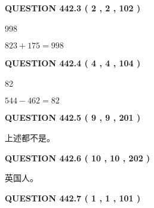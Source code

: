 \documentclass{ctexart}
\begin{document}
{\textbf{\Large{QUESTION
442.3 
 ( 2 , 2 , 102 )
}}}
  
  
 
 
\noindent{}

998
 
 
 
 
\noindent{}

$ %
823 +  %
175=   %
998$
 
 
  
\vspace{0.2in}
  
{\textbf{\Large{QUESTION
442.4 
 ( 4 , 4 , 104 )
}}}
  
  
 
 
\noindent{}

82
 
 
 
 
\noindent{}

$ %
544 -  %
462=   %
82$
 
 
  
\vspace{0.2in}
  
{\textbf{\Large{QUESTION
442.5 
 ( 9 , 9 , 201 )
}}}
  
  
 
 
\noindent{}
 
 
 上述都不是。
 
 
 
 
  
\vspace{0.2in}
  
{\textbf{\Large{QUESTION
442.6 
 ( 10 , 10 , 202 )
}}}
  
  
 
 
\noindent{}
 
 
英国人。
 
 
 
 
  
\vspace{0.2in}
  
{\textbf{\Large{QUESTION
442.7 
 ( 1 , 1 , 101 )
}}}
  
\end{document}
